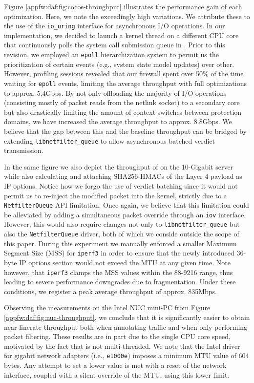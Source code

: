 

Figure \ref{appfw:daf:fig:cocos-throughput} illustrates the performance gain of each optimization. Here, we note the exceedingly high variations. We attribute these to the use of the \texttt{io\_uring} interface for asynchronous I/O operations. In our implementation, we decided to launch a kernel thread on a different CPU core that continuously polls the system call submission queue in \daf{}. Prior to this revision, we employed an \texttt{epoll} hierarchization system to permit us the prioritization of certain events (e.g., system state model updates) over other. However, profiling sessions revealed that our firewall spent over 50\% of the time waiting for \texttt{epoll} events, limiting the average throughput with full optimizations to approx. 5.4Gbps. By not only offloading the majority of I/O operations (consisting mostly of packet reads from the netlink socket) to a secondary core but also drastically limiting the amount of context switches between protection domains, we have increased the average throughput to approx. 8.8Gbps. We believe that the gap between this and the baseline throughput can be bridged by extending \texttt{libnetfilter\_queue} to allow asynchronous batched verdict transmission.

In the same figure we also depict the throughput of \daf{} on the 10-Gigabit server while also calculating and attaching SHA256-HMACs of the Layer 4 payload as IP options. Notice how we forgo the use of verdict batching since it would not permit us to re-inject the modified packet into the kernel, strictly due to a \texttt{NetfilterQueue} API limitation. Once again, we believe that this limitation could be alleviated by adding a simultaneous packet override through an \texttt{iov} interface. However, this would also require changes not only to \texttt{libnetfilter\_queue} but also the \texttt{NetfilterQueue} driver, both of which we conside outside the scope of this paper. During this experiment we manually enforced a smaller Maximum Segment Size (MSS) for \texttt{iperf3} in order to ensure that the newly introduced 36-byte IP options section would not exceed the MTU at any given time. Note however, that \texttt{iperf3} clamps the MSS values within the 88-9216 range, thus leading to severe performance downgrades due to fragmentation. Under these conditions, we register a peak average throughput of approx. 835Mbps.



Observing the measurements on the Intel NUC mini-PC from Figure \ref{appfw:daf:fig:nuc-throughput}, we conclude that it is significantly easier to obtain near-linerate throughput both when annotating traffic and when only performing packet filtering. These results are in part due to the single CPU core speed, motivated by the fact that \daf{} is not multi-threaded. We note that the Intel driver for gigabit network adapters (i.e., \texttt{e1000e}) imposes a minimum MTU value of 604 bytes. Any attempt to set a lower value is met with a reset of the network interface, coupled with a silent override of the MTU, using this lower limit.
